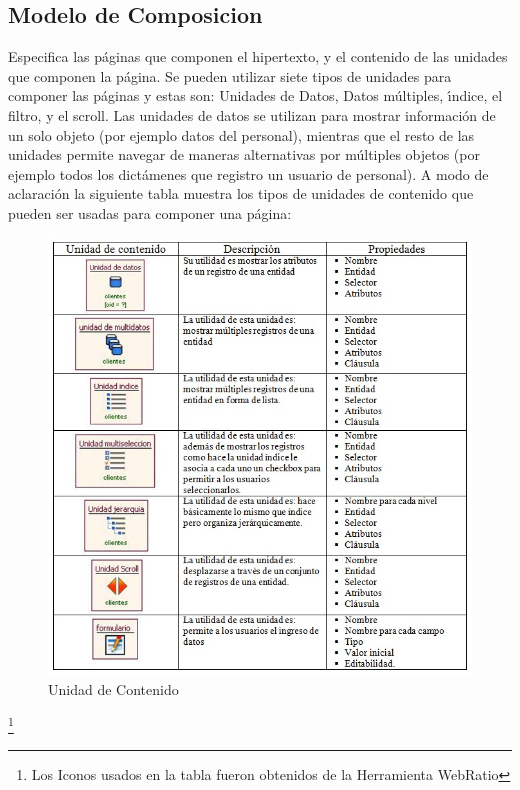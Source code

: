 \subsection{Modelo de Composicion}

Especifica las p\'aginas que componen  el hipertexto, y el contenido de las 
unidades que componen la p\'agina. Se pueden utilizar siete tipos de unidades 
para componer las p\'aginas y estas son: Unidades de Datos, Datos m\'ultiples, 
\'{\i}ndice, el filtro, y el scroll. Las unidades de datos se utilizan para mostrar 
informaci\'on de un solo objeto (por ejemplo datos del personal), mientras que 
el resto de las unidades permite navegar de maneras alternativas por m\'ultiples 
objetos (por ejemplo todos los dict\'amenes que registro un usuario de personal).
A modo de aclaraci\'on la siguiente tabla muestra los tipos de unidades de
contenido que pueden ser usadas para componer una p\'agina: \\[0.5cm]

\begin{figure}[H]
    \centering
    \includegraphics[scale=0.8]{resourse/tabla.jpg}
    \caption{Unidad de Contenido}
    \label{Tabla:01}
\end{figure} 

\footnote{ Los Iconos usados en la tabla fueron obtenidos de la Herramienta 
WebRatio}

